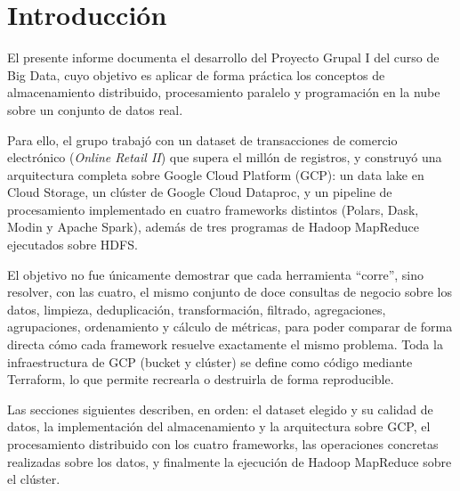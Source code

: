 \section{Introducción}

El presente informe documenta el desarrollo del Proyecto Grupal I del curso de Big Data, cuyo objetivo es aplicar de forma práctica los conceptos de almacenamiento distribuido, procesamiento paralelo y programación en la nube sobre un conjunto de datos real.

Para ello, el grupo trabajó con un dataset de transacciones de comercio electrónico (\emph{Online Retail II}) que supera el millón de registros, y construyó una arquitectura completa sobre Google Cloud Platform (GCP): un data lake en Cloud Storage, un clúster de Google Cloud Dataproc, y un pipeline de procesamiento implementado en cuatro frameworks distintos (Polars, Dask, Modin y Apache Spark), además de tres programas de Hadoop MapReduce ejecutados sobre HDFS.

El objetivo no fue únicamente demostrar que cada herramienta ``corre'', sino resolver, con las cuatro, el mismo conjunto de doce consultas de negocio sobre los datos, limpieza, deduplicación, transformación, filtrado, agregaciones, agrupaciones, ordenamiento y cálculo de métricas, para poder comparar de forma directa cómo cada framework resuelve exactamente el mismo problema. Toda la infraestructura de GCP (bucket y clúster) se define como código mediante Terraform, lo que permite recrearla o destruirla de forma reproducible.

Las secciones siguientes describen, en orden: el dataset elegido y su calidad de datos, la implementación del almacenamiento y la arquitectura sobre GCP, el procesamiento distribuido con los cuatro frameworks, las operaciones concretas realizadas sobre los datos, y finalmente la ejecución de Hadoop MapReduce sobre el clúster.
